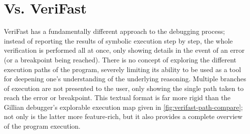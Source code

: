 \section{Vs. VeriFast}

VeriFast has a fundamentally different approach to the debugging process;
instead of reporting the results of symbolic execution step by step, the whole
verification is performed all at once, only showing details in the event of an
error (or a breakpoint being reached). There is no concept of exploring the
different execution paths of the program, severely limiting its ability to be
used as a tool for deepening one's understanding of the underlying reasoning. Multiple
branches of execution are not presented to the user, only showing the single
path taken to reach the error or breakpoint. This textual format is far more rigid than the Gillian debugger's explorable execution map given in
\autoref{fig:verifast-path-compare}; not only is the latter more feature-rich,
but it also provides a complete overview of the program execution.


